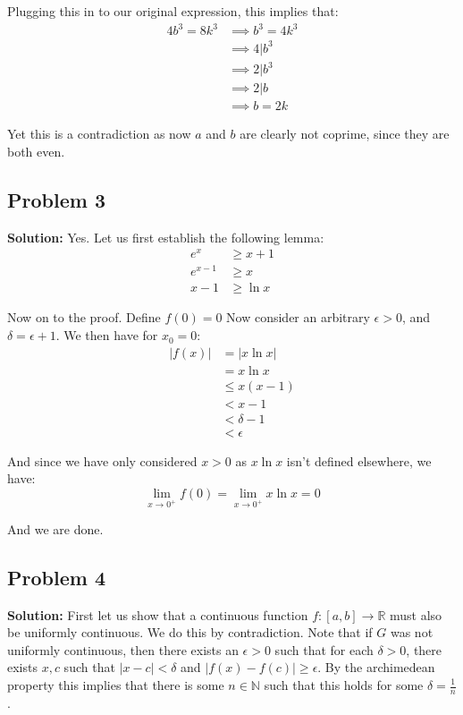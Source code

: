 \documentclass{article}
\newcommand{\R}{\mathbb R}
\newcommand{\N}{\mathbb N}
\begin{document}
Plugging this in to our original expression, this implies that:
\begin{align*}
  4b^3=8k^3&\implies b^3=4k^3\tag{$a=2k$}\\
  &\implies 4|b^3\\
  &\implies 2|b^3\tag{$2|4$}\\
  &\implies 2|b\tag{2 is prime}\\
  &\implies b=2k\tag{$b$ is even}
\end{align*}

Yet this is a contradiction as now $a$ and $b$ are clearly not coprime, since they are both even.

\subsection*{Problem 3}
\noindent\textbf{Solution:} Yes. Let us first establish the following lemma:
\begin{align*}
  e^x&\ge x+1\\
  e^{x-1}&\ge x\\
  x-1&\ge\ln x\tag{lemma 1}
\end{align*}

Now on to the proof. Define $f(0)=0$ Now consider an arbitrary $\epsilon>0$, and $\delta=\epsilon+1$. We then have for $x_0=0$:
\begin{align*}
  |f(x)|&=|x\ln x|\\
  &=x\ln x\tag{$x>0$}\\
  &\le x(x-1)\tag{lemma 1}\\
  &<x-1\\
  &<\delta-1\tag{assume $0<|x|<\delta$}\\
  &<\epsilon\tag{$\delta=\epsilon+1$}
\end{align*}

And since we have only considered $x>0$ as $x\ln x$ isn't defined elsewhere, we have:
$$\lim_{x\to0^+}f(0)=\lim_{x\to0^+}x\ln x=0$$

And we are done.

\subsection*{Problem 4}
\noindent\textbf{Solution:} First let us show that a continuous function $f:[a,b]\to\R$ must also be uniformly continuous. We do this by contradiction. Note that if $G$ was not uniformly continuous, then there exists an $\epsilon>0$ such that for each $\delta>0$, there exists $x,c$ such that $|x-c|<\delta$ and $|f(x)-f(c)|\ge \epsilon$. By the archimedean property this implies that there is some $n\in\N$ such that this holds for some $\delta=\frac{1}{n}$.
\end{document}

